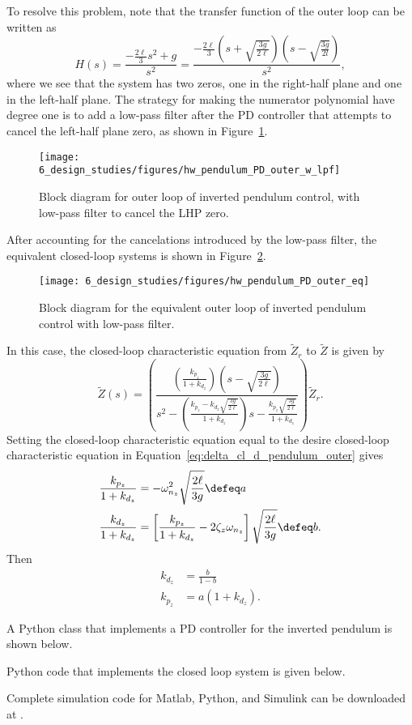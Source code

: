 To resolve this problem, note that the transfer function of the outer loop can be written as
\[
H(s) = \frac{-\frac{2\ell}{3}s^2 + g}{s^2}
     = \frac{-\frac{2\ell}{3}(s + \sqrt{\frac{3g}{2\ell}})(s-\sqrt{\frac{3g}{2l}})}{s^2},
\]
where we see that the system has two zeros, one in the right-half plane and one in the left-half plane.  The strategy for making the numerator polynomial have degree one is to add a low-pass filter after the PD controller that attempts to cancel the left-half plane zero, as shown in Figure~\ref{fig:hw_pendulum_PD_outer_w_lpf}.
%
\begin{figure}[htbp]
   	\centering
   	\texttt{[image: 6\_design\_studies/figures/hw\_pendulum\_PD\_outer\_w\_lpf]} 
   	\caption{Block diagram for outer loop of inverted pendulum control, with low-pass filter to cancel the LHP zero.}
   	\label{fig:hw_pendulum_PD_outer_w_lpf}
\end{figure}
%
After accounting for the cancelations introduced by the low-pass filter, the equivalent closed-loop systems is shown in Figure~\ref{fig:hw_pendulum_PD_outer_eq}.
\begin{figure}[htbp]
   	\centering
   	\texttt{[image: 6\_design\_studies/figures/hw\_pendulum\_PD\_outer\_eq]} 
   	\caption{Block diagram for the equivalent outer loop of inverted pendulum control with low-pass filter.}
   	\label{fig:hw_pendulum_PD_outer_eq}
\end{figure}
%
In this case, the closed-loop characteristic equation from $\tilde{Z}_r$ to $\tilde{Z}$ is given by
\[
\tilde{Z}(s) = \left( 
		\frac{\left(\frac{k_{p_z}}{1+k_{d_z}}\right) (s-\sqrt{\frac{3g}{2\ell}})}
		     {s^2 - \left(\frac{k_{p_z} - k_{d_z}\sqrt{\frac{3g}{2\ell}}}{1+k_{d_z}}\right)s - \frac{k_{p_z}\sqrt{\frac{3g}{2\ell}}}{1+k_{d_z}}} 
       \right) \tilde{Z}_r.
\]
Setting the closed-loop characteristic equation equal to the desire closed-loop characteristic equation in Equation~\eqref{eq:delta_cl_d_pendulum_outer} gives
\begin{align}
\frac{k_{p_z}}{1+k_{d_z}} &= -\omega_{n_z}^2\sqrt{\frac{2\ell}{3g}} \defeq a \\
\frac{k_{d_z}}{1+k_{d_z}} &= \left[\frac{k_{p_z}}{1+k_{d_z}} - 2\zeta_z \omega_{n_z} \right] \sqrt{\frac{2\ell}{3g}} \defeq b. 
\end{align}
Then 
\begin{align*}
k_{d_z} &= \frac{b}{1-b} \\
k_{p_z} &= a(1+k_{d_z}).
\end{align*}


A Python class that implements a PD controller for the inverted pendulum is shown below.


Python code that implements the closed loop system is given below.


Complete simulation code for Matlab, Python, and Simulink can be downloaded at .
